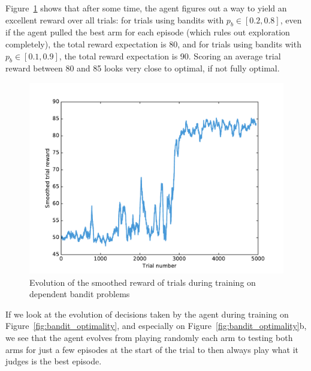 Figure~\ref{fig:bandit_reward} shows that after some time, the agent figures out
a way to yield an excellent reward over all trials: for trials using bandits
with $p_b \in [0.2, 0.8]$, even if the agent pulled the best arm for
each episode (which rules out exploration completely), the total reward
expectation is 80, and for trials using bandits with $p_b \in [0.1, 0.9]$, 
the total reward expectation is 90. Scoring an average trial reward between
80 and 85 looks very close to optimal, if not fully optimal.\\

\begin{figure}
	\centering
	\includegraphics[width=0.8\linewidth]{fig/bandit_reward.pdf}
	\caption{Evolution of the smoothed reward of trials during training on
	dependent bandit problems}
	\label{fig:bandit_reward}
\end{figure}

If we look at the evolution of decisions taken by the agent during training
on Figure~\ref{fig:bandit_optimality}, and especially on
Figure~\ref{fig:bandit_optimality}b, we see that the agent evolves from playing
randomly each arm to testing both arms for just a few episodes at the start
of the trial to then always play what it judges is the best episode.\\

